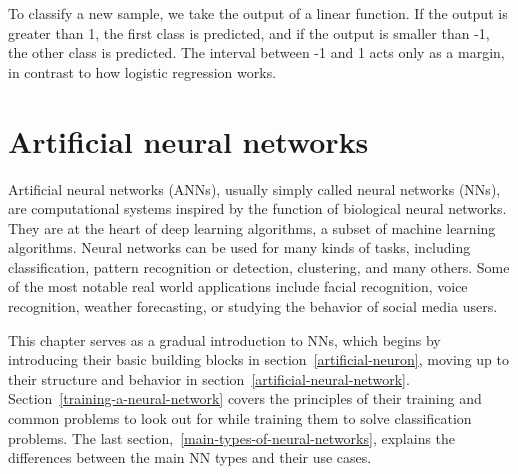 To classify a new sample, we take the output of a linear function.
If the output is greater than 1, the first class is predicted,
and if the output is smaller than -1, the other class is predicted.
The interval between -1 and 1 acts only as a margin, in contrast
to how logistic regression works. %








\chapter{Artificial neural networks}
\label{artificial-neural-networks}
Artificial neural networks (ANNs), usually simply called neural networks (NNs),
are computational systems inspired by the function of biological neural networks.
They are at the heart of deep learning algorithms, a subset of machine learning algorithms.
Neural networks can be used for many kinds of tasks, including classification, pattern recognition or 
detection, clustering, and many others.
Some of the most notable real world applications include facial recognition, voice recognition,
weather forecasting, or studying the behavior of social media users.

This chapter serves as a gradual introduction to NNs, which begins by introducing
their basic building blocks in section~\ref{artificial-neuron},
moving up to their structure and behavior in section~\ref{artificial-neural-network}.
Section~\ref{training-a-neural-network} covers the principles of their training
and common problems to look out for while training them to solve classification problems.
The last section,~\ref{main-types-of-neural-networks}, explains
the differences between the main NN types and their use cases.




